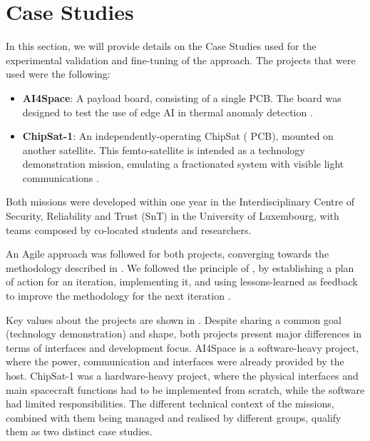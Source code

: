\documentclass[journal,10pt]{IEEEtran}
\begin{document}
\section{Case Studies}
\label{sec:case_studies}

In this section, we will provide details on the Case Studies
used for the experimental validation and fine-tuning of the approach. The projects that were used were the following:
\begin{itemize}
	\item \textbf{AI4Space}: A payload board, consisting of a single  \ac{PCB}. The board was designed to test the use of edge \acl{AI} in thermal anomaly detection \autocite{thoemelLeanDemonstrationBoard2024}.%
	\item \textbf{ChipSat-1}: An independently-operating ChipSat ( \ac{PCB}), mounted on another satellite. This femto-satellite is intended as a technology demonstration mission, emulating a fractionated system with visible light communications \autocite{borgueDevelopingDistributedFractionated2022a}. %
\end{itemize}

Both missions were developed within one year in the Interdisciplinary Centre of Security, Reliability and Trust (SnT) in the University of Luxembourg,
with teams composed by co-located students and researchers.


An Agile approach was followed for both projects, converging towards the methodology described in . We followed the principle of , by establishing a plan of action for an iteration, implementing it, and using lessons-learned as feedback to improve the methodology for the next iteration \autocite{mcniffActionResearchPrinciples2003}. 


Key values about the projects are shown in .
Despite sharing a common goal (technology demonstration) and shape, both projects present major differences in terms of interfaces and development focus. AI4Space is a software-heavy project, where the power, communication and interfaces were already provided by the host. ChipSat-1 was a hardware-heavy project, where the physical interfaces and main spacecraft functions had to be implemented from scratch, while the software had limited responsibilities. The different technical context of the missions, combined with them being managed and realised by different groups, qualify them as two distinct case studies.
\end{document}
